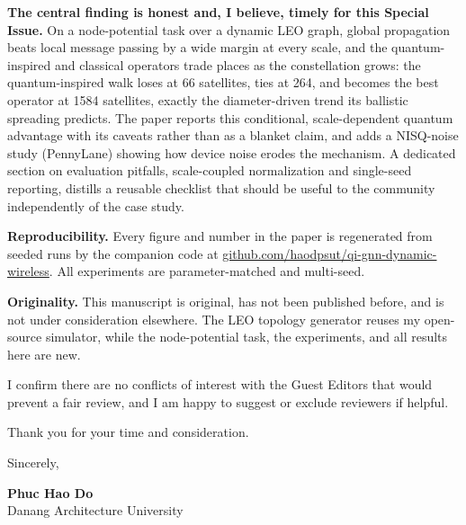 \documentclass[11pt]{article}
\begin{document}
\textbf{The central finding is honest and, I believe, timely for this Special Issue.} On a
node-potential task over a dynamic LEO graph, global propagation beats local message
passing by a wide margin at every scale, and the quantum-inspired and classical operators
trade places as the constellation grows: the quantum-inspired walk loses at 66 satellites,
ties at 264, and becomes the best operator at 1584 satellites, exactly the
diameter-driven trend its ballistic spreading predicts. The paper reports this
conditional, scale-dependent quantum advantage with its caveats rather than as a blanket
claim, and adds a NISQ-noise study (PennyLane) showing how device noise erodes the
mechanism. A dedicated section on evaluation pitfalls, scale-coupled normalization and
single-seed reporting, distills a reusable checklist that should be useful to the
community independently of the case study.

\textbf{Reproducibility.} Every figure and number in the paper is regenerated from seeded
runs by the companion code at
\href{https://github.com/haodpsut/qi-gnn-dynamic-wireless}{github.com/haodpsut/qi-gnn-dynamic-wireless}.
All experiments are parameter-matched and multi-seed.

\textbf{Originality.} This manuscript is original, has not been published before, and is
not under consideration elsewhere. The LEO topology generator reuses my open-source
simulator, while the node-potential task, the experiments, and all results here are new.

I confirm there are no conflicts of interest with the Guest Editors that would prevent a
fair review, and I am happy to suggest or exclude reviewers if helpful.

Thank you for your time and consideration.

\vspace{1.4em}
\noindent Sincerely,

\vspace{0.4em}
\noindent\textbf{Phuc Hao Do}\\
Danang Architecture University
\end{document}
